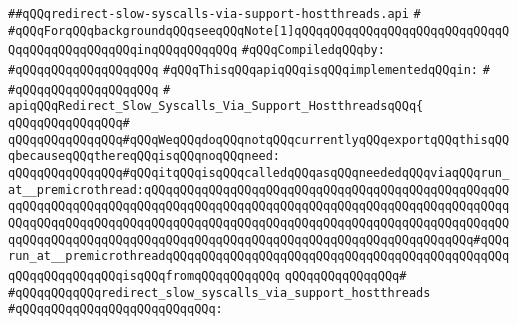 \label{src/lib/src/lib/thread-kit/src/glue/redirect-slow-syscalls-via-support-hostthreads.api}
\verb|##qQQqredirect-slow-syscalls-via-support-hostthreads.api|\newline
\verb|#|\newline
\verb|#qQQqForqQQqbackgroundqQQqseeqQQqNote[1]qQQqqQQqqQQqqQQqqQQqqQQqqQQqqQQqqQQqqQQqqQQqqQQqinqQQqqQQqqQQq|\newline
\newline
\verb|#qQQqCompiledqQQqby:|\newline
\verb|#qQQqqQQqqQQqqQQqqQQq|\newline
\newline
\verb|#qQQqThisqQQqapiqQQqisqQQqimplementedqQQqin:|\newline
\verb|#|\newline
\verb|#qQQqqQQqqQQqqQQqqQQq|\newline
\verb|#|\newline
\verb|apiqQQqRedirect_Slow_Syscalls_Via_Support_HostthreadsqQQq{|\newline
\verb|qQQqqQQqqQQqqQQq#|\newline
\newline
\verb|qQQqqQQqqQQqqQQq#qQQqWeqQQqdoqQQqnotqQQqcurrentlyqQQqexportqQQqthisqQQqbecauseqQQqthereqQQqisqQQqnoqQQqneed:|\newline
\verb|qQQqqQQqqQQqqQQq#qQQqitqQQqisqQQqcalledqQQqasqQQqneededqQQqviaqQQqrun_at__premicrothread:qQQqqQQqqQQqqQQqqQQqqQQqqQQqqQQqqQQqqQQqqQQqqQQqqQQqqQQqqQQqqQQqqQQqqQQqqQQqqQQqqQQqqQQqqQQqqQQqqQQqqQQqqQQqqQQqqQQqqQQqqQQqqQQqqQQqqQQqqQQqqQQqqQQqqQQqqQQqqQQqqQQqqQQqqQQqqQQqqQQqqQQqqQQqqQQqqQQqqQQqqQQqqQQqqQQqqQQqqQQqqQQqqQQqqQQqqQQqqQQqqQQqqQQqqQQqqQQq#qQQqrun_at__premicrothreadqQQqqQQqqQQqqQQqqQQqqQQqqQQqqQQqqQQqqQQqqQQqqQQqqQQqqQQqqQQqqQQqisqQQqfromqQQqqQQqqQQq|\newline
\verb|qQQqqQQqqQQqqQQq#|\newline
\verb|#qQQqqQQqqQQqredirect_slow_syscalls_via_support_hostthreads|\newline
\verb|#qQQqqQQqqQQqqQQqqQQqqQQqqQQq:|\newline
